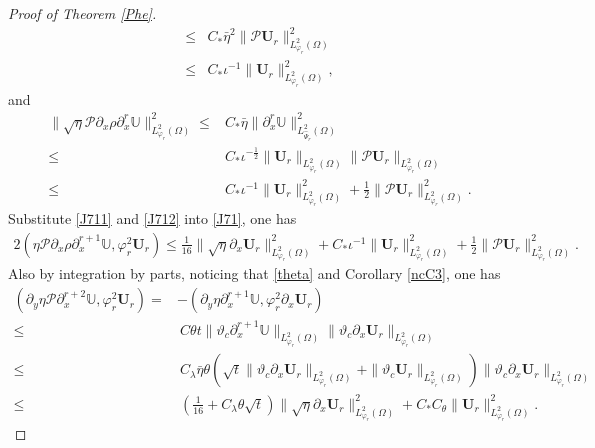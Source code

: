 \documentclass{amsart}
\numberwithin{equation}{section}
\begin{document}
\begin{proof}[Proof of Theorem \ref{Phe}]
\begin{align}
\leq& C_{*}\bar{\eta}^{2}\|\mathcal{P}\mathbf{U}_{r}\|_{L_{\varphi_{r}}^{2}(\Omega)}^{2}\nonumber\\
\leq& C_{*}\iota^{-1}\|\mathbf{U}_{r}\|_{L_{\varphi_{r}}^{2}(\Omega)}^{2},\nonumber
\end{align}
and
\begin{align}\label{J712}
\|\sqrt{\eta}\mathcal{P}\partial_{x}\rho\partial_{x}^{r}\mathbb{U}\|_{L_{\varphi_{r}}^{2}(\Omega)}^{2}
\leq& C_{*}\bar{\eta}\|\partial_{x}^{r}\mathbb{U}\|_{L_{\hat{\Psi}_{r}}^{2}(\Omega)}^{2}\\
\leq& C_{*}\iota^{-\frac{1}{2}}\|\mathbf{U}_{r}\|_{L_{\varphi_{r}}^{2}(\Omega)}\|\mathcal{P}\mathbf{U}_{r}\|_{L_{\varphi_{r}}^{2}(\Omega)}\nonumber\\
\leq& C_{*}\iota^{-1}\|\mathbf{U}_{r}\|_{L_{\varphi_{r}}^{2}(\Omega)}^{2}
     +\frac{1}{2}\|\mathcal{P}\mathbf{U}_{r}\|_{L_{\varphi_{r}}^{2}(\Omega)}^{2}.\nonumber
\end{align}
Substitute \eqref{J711} and \eqref{J712} into \eqref{J71}, one has
\begin{align}\label{J71'}
2(\eta\mathcal{P}\partial_{x}\rho\partial_{x}^{r+1}\mathbb{U},\varphi_{r}^{2}\mathbf{U}_{r})
\leq \frac{1}{16}\|\sqrt{\eta}\partial_{x}\mathbf{U}_{r}\|_{L_{\varphi_{r}}^{2}(\Omega)}^{2}
    +C_{*}\iota^{-1}\|\mathbf{U}_{r}\|_{L_{\varphi_{r}}^{2}(\Omega)}^{2}
    +\frac{1}{2}\|\mathcal{P}\mathbf{U}_{r}\|_{L_{\varphi_{r}}^{2}(\Omega)}^{2}.
\end{align}
Also by integration by parts, noticing that \eqref{theta} and Corollary \ref{ncC3}, one has
\begin{align*}
(\partial_{y}\eta\mathcal{P}\partial_{x}^{r+2}\mathbb{U},\varphi_{r}^{2}\mathbf{U}_{r})
=&-(\partial_{y}\eta\partial_{x}^{r+1}\mathbb{U},\varphi_{r}^{2}\partial_{x}\mathbf{U}_{r})\\
\leq&~C\theta t\|\vartheta_{c}\partial_{x}^{r+1}\mathbb{U}\|_{L_{\varphi_{r}}^{2}(\Omega)}
       \|\vartheta_{c}\partial_{x}\mathbf{U}_{r}\|_{L_{\varphi_{r}}^{2}(\Omega)}\\
\leq&~C_{\lambda}\bar{\eta}\theta\left(\sqrt{t}\|\vartheta_{c}\partial_{x}\mathbf{U}_{r}\|_{L_{\varphi_{r}}^{2}(\Omega)}
                                       +\|\vartheta_{c}\mathbf{U}_{r}\|_{L_{\varphi_{r}}^{2}(\Omega)}\right)
      \|\vartheta_{c}\partial_{x}\mathbf{U}_{r}\|_{L_{\varphi_{r}}^{2}(\Omega)}\\
\leq&~\left(\frac{1}{16}+C_{\lambda}\theta\sqrt{t}\right)\|\sqrt{\eta}\partial_{x}\mathbf{U}_{r}\|_{L_{\varphi_{r}}^{2}(\Omega)}^{2}
     +C_{*}C_{\theta}\|\mathbf{U}_{r}\|_{L_{\varphi_{r}}^{2}(\Omega)}^{2}.

\end{align*}
\end{proof}
\end{document}
